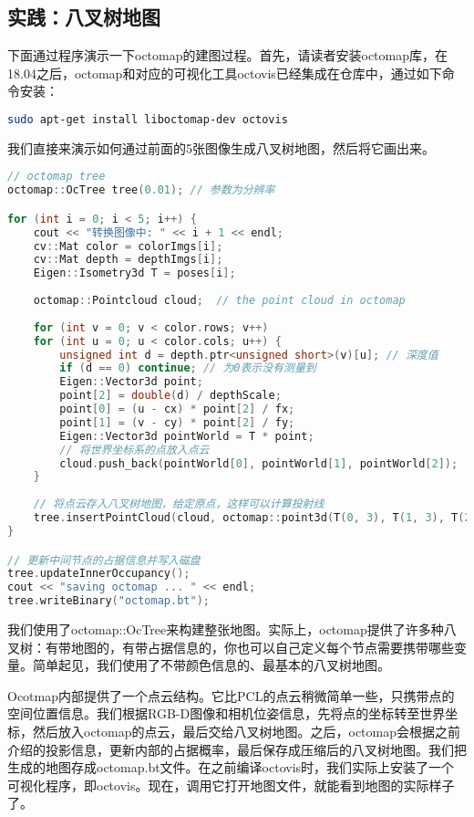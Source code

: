 \subsection{实践：八叉树地图}
下面通过程序演示一下octomap的建图过程。首先，请读者安装octomap库，在18.04之后，octomap和对应的可视化工具octovis已经集成在仓库中，通过如下命令安装：
\begin{lstlisting}[language=sh,caption=终端输入：]
sudo apt-get install liboctomap-dev octovis
\end{lstlisting}

我们直接来演示如何通过前面的5张图像生成八叉树地图，然后将它画出来。
\begin{lstlisting}[language=c++,caption=slambook/ch13/dense\_RGBD/octomap\_mapping.cpp（片段）]
// octomap tree 
octomap::OcTree tree(0.01); // 参数为分辨率

for (int i = 0; i < 5; i++) {
    cout << "转换图像中: " << i + 1 << endl;
    cv::Mat color = colorImgs[i];
    cv::Mat depth = depthImgs[i];
    Eigen::Isometry3d T = poses[i];
    
    octomap::Pointcloud cloud;  // the point cloud in octomap 
    
    for (int v = 0; v < color.rows; v++)
    for (int u = 0; u < color.cols; u++) {
        unsigned int d = depth.ptr<unsigned short>(v)[u]; // 深度值
        if (d == 0) continue; // 为0表示没有测量到
        Eigen::Vector3d point;
        point[2] = double(d) / depthScale;
        point[0] = (u - cx) * point[2] / fx;
        point[1] = (v - cy) * point[2] / fy;
        Eigen::Vector3d pointWorld = T * point;
        // 将世界坐标系的点放入点云
        cloud.push_back(pointWorld[0], pointWorld[1], pointWorld[2]);
    }
    
    // 将点云存入八叉树地图，给定原点，这样可以计算投射线
    tree.insertPointCloud(cloud, octomap::point3d(T(0, 3), T(1, 3), T(2, 3)));
}

// 更新中间节点的占据信息并写入磁盘
tree.updateInnerOccupancy();
cout << "saving octomap ... " << endl;
tree.writeBinary("octomap.bt");
\end{lstlisting}

我们使用了octomap::OcTree来构建整张地图。实际上，octomap提供了许多种八叉树：有带地图的，有带占据信息的，你也可以自己定义每个节点需要携带哪些变量。简单起见，我们使用了不带颜色信息的、最基本的八叉树地图。

Ocotmap内部提供了一个点云结构。它比PCL的点云稍微简单一些，只携带点的空间位置信息。我们根据RGB-D图像和相机位姿信息，先将点的坐标转至世界坐标，然后放入octomap的点云，最后交给八叉树地图。之后，octomap会根据之前介绍的投影信息，更新内部的占据概率，最后保存成压缩后的八叉树地图。我们把生成的地图存成octomap.bt文件。在之前编译octovis时，我们实际上安装了一个可视化程序，即octovis。现在，调用它打开地图文件，就能看到地图的实际样子了。

